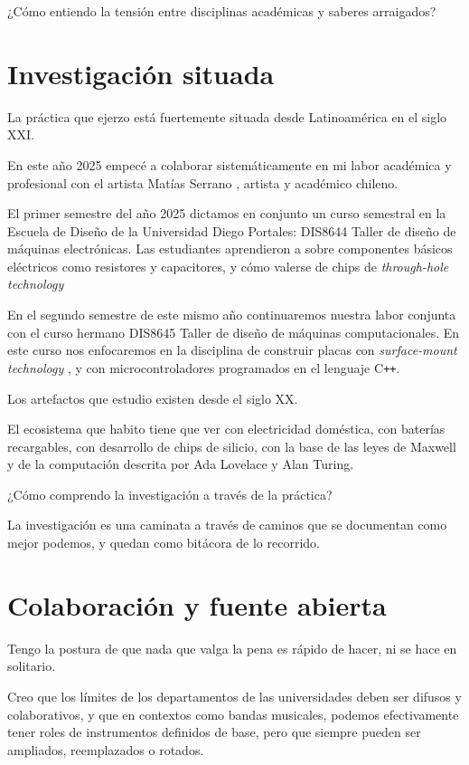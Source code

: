 \documentclass{article}
\begin{document}
¿Cómo entiendo la tensión entre disciplinas académicas y saberes arraigados?

\clearpage

\section{Investigación situada}

La práctica que ejerzo está fuertemente situada desde Latinoamérica en el siglo XXI.

En este año 2025 empecé a colaborar sistemáticamente en mi labor académica y profesional con el artista Matías Serrano \cite{misaa}, artista y académico chileno.

El primer semestre del año 2025 dictamos en conjunto un curso semestral en la Escuela de Diseño de la Universidad Diego Portales: DIS8644 Taller de diseño de máquinas electrónicas. Las estudiantes aprendieron a sobre componentes básicos eléctricos como resistores y capacitores, y cómo valerse de chips de \textit{through-hole technology} \cite{tht}

En el segundo semestre de este mismo año continuaremos nuestra labor conjunta con el curso hermano DIS8645 Taller de diseño de máquinas computacionales. En este curso nos enfocaremos en la disciplina de construir placas con \textit{surface-mount technology} \cite{smt}, y con microcontroladores programados en el lenguaje C\texttt{++}.

Los artefactos que estudio existen desde el siglo XX.

El ecosistema que habito tiene que ver con electricidad doméstica, con baterías recargables, con desarrollo de chips de silicio, con la base de las leyes de Maxwell y de la computación descrita por Ada Lovelace y Alan Turing.

¿Cómo comprendo la investigación a través de la práctica?

La investigación es una caminata a través de caminos que se documentan como mejor podemos, y quedan como bitácora de lo recorrido.

\clearpage

\section{Colaboración y fuente abierta}

Tengo la postura de que nada que valga la pena es rápido de hacer, ni se hace en solitario.

Creo que los límites de los departamentos de las universidades deben ser difusos y colaborativos, y que en contextos como bandas musicales, podemos efectivamente tener roles de instrumentos definidos de base, pero que siempre pueden ser ampliados, reemplazados o rotados.
\end{document}
